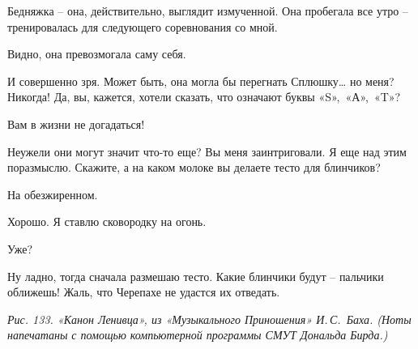 \documentclass[../main.tex]{subfiles}
\begin{document}
\begin{dialogue}
 Бедняжка \--- она, действительно, выглядит измученной. Она пробегала все утро \--- тренировалась для следующего соревнования со мной.

 Видно, она превозмогала саму себя.

 И совершенно зря. Может быть, она могла бы перегнать Сплюшку\ldots{} но меня? Никогда! Да, вы, кажется, хотели сказать, что означают буквы «S»,~«А»,~«T»?

 Вам в жизни не догадаться!

 Неужели они могут значит что-то еще? Вы меня заинтриговали. Я еще над этим поразмыслю. Скажите, а на каком молоке вы делаете тесто для блинчиков?

 На обезжиренном.

 Хорошо. Я ставлю сковородку на огонь.

 Уже?

 Ну ладно, тогда сначала размешаю тесто. Какие блинчики будут \--- пальчики оближешь! Жаль, что Черепахе не удастся их отведать.

\emph{Рис. 133. «Канон Ленивца», из «Музыкального Приношения» И.\,С.~Баха. (Ноты напечатаны с помощью компьютерной программы СМУТ Дональда Бирда.)}

\end{dialogue}
\end{document}
